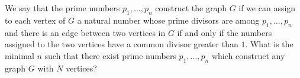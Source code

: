 We say that the prime numbers $p_1,\dots,p_n$ construct the graph $G$ if we can assign to each vertex of $G$ a natural number whose prime divisors are among $p_1,\dots,p_n$ and there is an edge between two vertices in $G$ if and only if the numbers assigned to the two vertices have a common divisor greater than $1$. What is the minimal $n$ such that there exist prime numbers $p_1,\dots,p_n$ which construct any graph $G$ with $N$ vertices?